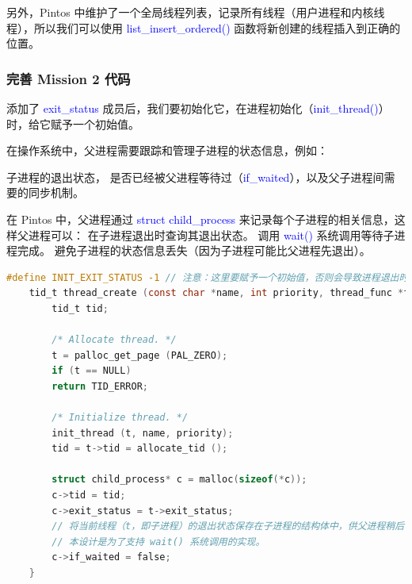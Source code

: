 \documentclass[14pt,a4paper,UTF8,twoside]{article}
\renewcommand{\texttt}[1]{\textcolor{blue}{\ttfamily #1}}
\begin{document}
\vspace{0.3cm}

\begin{cth}
另外，Pintos 中维护了一个全局线程列表，记录所有线程（用户进程和内核线程），所以我们可以使用 \texttt{list\_insert\_ordered()} 函数将新创建的线程插入到正确的位置。
\end{cth}

\subsubsection{完善 Mission 2 代码}

添加了 \texttt{exit\_status} 成员后，我们要初始化它，在进程初始化（\texttt{init\_thread()}）时，给它赋予一个初始值。

\begin{cth}
在操作系统中，父进程需要跟踪和管理子进程的状态信息，例如：

子进程的退出状态，
是否已经被父进程等待过（\texttt{if\_waited}），以及父子进程间需要的同步机制。

\vspace{0.5cm}

在 Pintos 中，父进程通过 \texttt{struct child\_process} 来记录每个子进程的相关信息，这样父进程可以：
在子进程退出时查询其退出状态。
调用 \texttt{wait()} 系统调用等待子进程完成。
避免子进程的状态信息丢失（因为子进程可能比父进程先退出）。

\end{cth}

\begin{lstlisting}[language=C,title= init\_thread]
    #define INIT_EXIT_STATUS -1 // 注意：这里要赋予一个初始值，否则会导致进程退出时打印出未初始化的地址
    tid_t thread_create (const char *name, int priority, thread_func *function, void *aux) {
        tid_t tid;
        
        /* Allocate thread. */
        t = palloc_get_page (PAL_ZERO);
        if (t == NULL)
        return TID_ERROR;

        /* Initialize thread. */
        init_thread (t, name, priority);
        tid = t->tid = allocate_tid ();

        struct child_process* c = malloc(sizeof(*c)); 
        c->tid = tid;
        c->exit_status = t->exit_status;
        // 将当前线程（t，即子进程）的退出状态保存在子进程的结构体中，供父进程稍后访问。
        // 本设计是为了支持 wait() 系统调用的实现。
        c->if_waited = false;
    }
\end{lstlisting}
\end{document}
